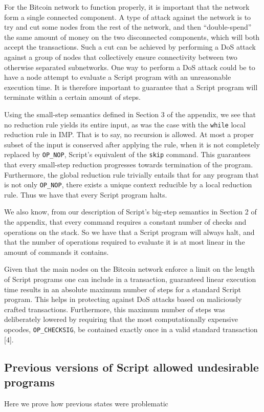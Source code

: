 \documentclass[letterpaper, 10 pt, conference]{ieeeconf}
\begin{document}
For the Bitcoin network to function properly, it is important that the network form a single connected component. A type of attack against the network is to try and cut some nodes from the rest of the network, and then ``double-spend'' the same amount of money on the two disconnected components, which will both accept the transactions. Such a cut can be achieved by performing a DoS attack against a group of nodes that collectively ensure connectivity between two otherwise separated subnetworks. One way to perform a DoS attack could be to have a node attempt to evaluate a Script program with an unreasonable execution time. It is therefore important to guarantee that a Script program will terminate within a certain amount of steps.

Using the small-step semantics defined in Section 3 of the appendix, we see that no reduction rule yields its entire input, as was the case with the \texttt{while} local reduction rule in IMP. That is to say, no recursion is allowed. At most a proper subset of the input is conserved after applying the rule, when it is not completely replaced by \texttt{OP\_NOP}, Script's equivalent of the \texttt{skip} command. This guarantees that every small-step reduction progresses towards termination of the program. Furthermore, the global reduction rule trivially entails that for any program that is not only \texttt{OP\_NOP}, there exists a unique context reducible by a local reduction rule. Thus we have that every Script program halts.

We also know, from our description of Script's big-step semantics in Section 2 of the appendix, that every command requires a constant number of checks and operations on the stack. So we have that a Script program will always halt, and that the number of operations required to evaluate it is at most linear in the amount of commands it contains.

Given that the main nodes on the Bitcoin network enforce a limit on the length of Script programs one can include in a transaction, guaranteed linear execution time results in an absolute maximum number of steps for a standard Script program. This helps in protecting against DoS attacks based on maliciously crafted transactions. Furthermore, this maximum number of steps was deliberately lowered by requiring that the most computationally expensive opcodes, \texttt{OP\_CHECKSIG}, be contained exactly once in a valid standard transaction [4].


\subsection{Previous versions of Script allowed undesirable programs}
Here we prove how previous states were problematic
\end{document}
